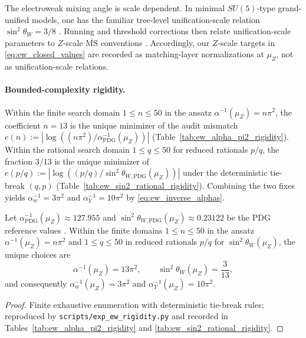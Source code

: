 \begin{remark}\label{rem:gutsin2_benchmark}
The electroweak mixing angle is scale dependent.
In minimal $SU(5)$-type grand-unified models, one has the familiar tree-level unification-scale relation $\sin^2\theta_W=3/8$ \cite{GeorgiGlashow1974SU5,Langacker1981GUT}.
Running and threshold corrections then relate unification-scale parameters to $Z$-scale $\overline{\mathrm{MS}}$ conventions \cite{PDGRPP2024,PeskinSchroeder1995}.
Accordingly, our $Z$-scale targets in \eqref{eq:ew_closed_values} are recorded as matching-layer normalizations at $\mu_Z$, not as unification-scale relations.
\end{remark}

\paragraph{Bounded-complexity rigidity.}
Within the finite search domain $1\le n\le 50$ in the ansatz $\alpha^{-1}(\mu_Z)=n\pi^2$, the coefficient $n=13$ is the unique minimizer of the audit mismatch $e(n):=|\log((n\pi^2)/\alpha^{-1}_{\mathrm{PDG}}(\mu_Z))|$ (Table~\ref{tab:ew_alpha_pi2_rigidity}).
Within the rational search domain $1\le q\le 50$ for reduced rationals $p/q$, the fraction $3/13$ is the unique minimizer of $e(p/q):=|\log((p/q)/\sin^2\theta_{W,\mathrm{PDG}}(\mu_Z))|$ under the deterministic tie-break $(q,p)$ (Table~\ref{tab:ew_sin2_rational_rigidity}).
Combining the two fixes yields $\alpha_w^{-1}=3\pi^2$ and $\alpha_Y^{-1}=10\pi^2$ by \eqref{eq:ew_inverse_alphas}.
\begin{proposition}\label{prop:ew_rigidity}
Let $\alpha^{-1}_{\mathrm{PDG}}(\mu_Z)\approx 127.955$ and $\sin^2\theta_{W,\mathrm{PDG}}(\mu_Z)\approx 0.23122$ be the PDG reference values \cite{PDGRPP2024}.
Within the finite domains $1\le n\le 50$ in the ansatz $\alpha^{-1}(\mu_Z)=n\pi^2$ and $1\le q\le 50$ in reduced rationals $p/q$ for $\sin^2\theta_W(\mu_Z)$, the unique choices are
\[
\alpha^{-1}(\mu_Z)=13\pi^2,\qquad \sin^2\theta_W(\mu_Z)=\frac{3}{13},
\]
and consequently $\alpha_w^{-1}(\mu_Z)=3\pi^2$ and $\alpha_Y^{-1}(\mu_Z)=10\pi^2$.
\end{proposition}
\begin{proof}
Finite exhaustive enumeration with deterministic tie-break rules; reproduced by \texttt{scripts/exp\_ew\_rigidity.py} and recorded in Tables~\ref{tab:ew_alpha_pi2_rigidity} and \ref{tab:ew_sin2_rational_rigidity}.
\end{proof}

